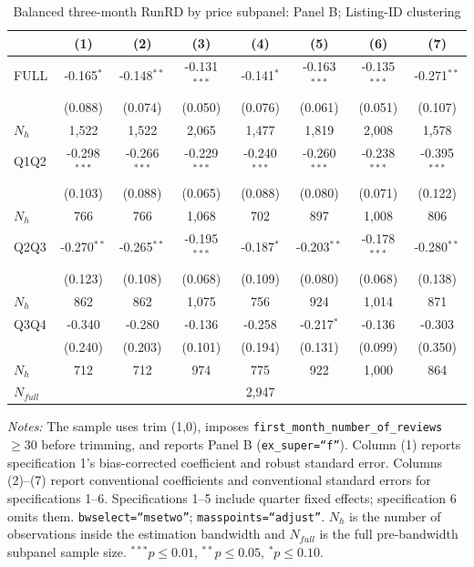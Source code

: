 \begin{table}[!htbp]
\centering
\caption{Balanced three-month RunRD by price subpanel: Panel B; Listing-ID clustering}
\scriptsize
\setlength{\tabcolsep}{5pt}
\begin{tabular}{l*{7}{c}}
\toprule
 & (1) & (2) & (3) & (4) & (5) & (6) & (7) \\
\midrule
FULL & -0.165$^{*}$ & -0.148$^{**}$ & -0.131$^{***}$ & -0.141$^{*}$ & -0.163$^{***}$ & -0.135$^{***}$ & -0.271$^{**}$ \\
 & (0.088) & (0.074) & (0.050) & (0.076) & (0.061) & (0.051) & (0.107) \\
$N_h$ & 1,522 & 1,522 & 2,065 & 1,477 & 1,819 & 2,008 & 1,578 \\
\addlinespace
Q1Q2 & -0.298$^{***}$ & -0.266$^{***}$ & -0.229$^{***}$ & -0.240$^{***}$ & -0.260$^{***}$ & -0.238$^{***}$ & -0.395$^{***}$ \\
 & (0.103) & (0.088) & (0.065) & (0.088) & (0.080) & (0.071) & (0.122) \\
$N_h$ & 766 & 766 & 1,068 & 702 & 897 & 1,008 & 806 \\
\addlinespace
Q2Q3 & -0.270$^{**}$ & -0.265$^{**}$ & -0.195$^{***}$ & -0.187$^{*}$ & -0.203$^{**}$ & -0.178$^{***}$ & -0.280$^{**}$ \\
 & (0.123) & (0.108) & (0.068) & (0.109) & (0.080) & (0.068) & (0.138) \\
$N_h$ & 862 & 862 & 1,075 & 756 & 924 & 1,014 & 871 \\
\addlinespace
Q3Q4 & -0.340 & -0.280 & -0.136 & -0.258 & -0.217$^{*}$ & -0.136 & -0.303 \\
 & (0.240) & (0.203) & (0.101) & (0.194) & (0.131) & (0.099) & (0.350) \\
$N_h$ & 712 & 712 & 974 & 775 & 922 & 1,000 & 864 \\

\midrule
$N_{full}$ & \multicolumn{7}{c}{2,947} \\
\bottomrule
\end{tabular}
\begin{minipage}{0.98\textwidth}
\footnotesize
\textit{Notes:} The sample uses trim (1,0), imposes \texttt{first\_month\_number\_of\_reviews}$\geq30$ before trimming, and reports Panel B (\texttt{ex\_super=``f''}). Column (1) reports specification 1's bias-corrected coefficient and robust standard error. Columns (2)--(7) report conventional coefficients and conventional standard errors for specifications 1--6. Specifications 1--5 include quarter fixed effects; specification 6 omits them. \texttt{bwselect=``msetwo''}; \texttt{masspoints=``adjust''}. $N_h$ is the number of observations inside the estimation bandwidth and $N_{full}$ is the full pre-bandwidth subpanel sample size. $^{***}p\leq0.01$, $^{**}p\leq0.05$, $^{*}p\leq0.10$.
\end{minipage}
\end{table}
\clearpage
